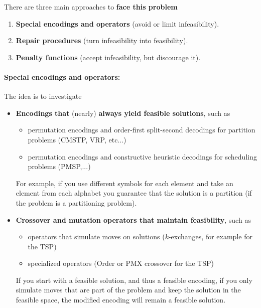 \documentclass[11pt]{article}
\begin{document}
	There are three main approaches to \textbf{face this problem}
	\begin{enumerate}
		\item \textbf{Special encodings and operators} (avoid or limit infeasibility).\\
		
		\item \textbf{Repair procedures} (turn infeasibility into feasibility).\\
		
		\item \textbf{Penalty functions} (accept infeasibility, but discourage it).\\
	\end{enumerate}
	
	\newpage
	
	\paragraph{Special encodings and operators:} The idea is to investigate
	\begin{itemize}
		\item \textbf{Encodings that} (nearly) \textbf{always yield feasible solutions}, such as
		\begin{itemize}
			\item permutation encodings and order-first split-second decodings for partition problems (CMSTP, VRP, etc...)
			\item permutation encodings and constructive heuristic decodings for scheduling problems (PMSP,...)
		\end{itemize}
		For example, if you use different symbols for each element and take an element from each alphabet you guarantee that the solution is a partition (if the problem is a partitioning problem).\\
		
		\item \textbf{Crossover and mutation operators that maintain feasibility}, such as
		\begin{itemize}
			\item operators that simulate moves on solutions ($k$-exchanges, for example for the TSP)
			\item specialized operators (Order or PMX crossover for the TSP)
		\end{itemize}
		If you start with a feasible solution, and thus a feasible encoding, if you only simulate moves that are part of the problem and keep the solution in the feasible space, the modified encoding will remain a feasible solution.\\
	\end{itemize}
	
\end{document}
